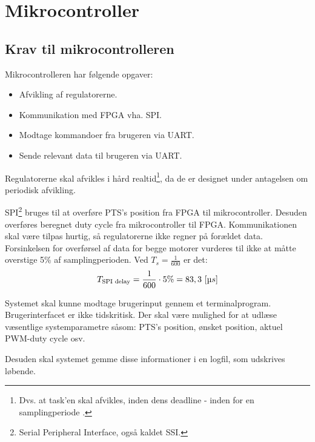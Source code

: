 \section{Mikrocontroller}
\label{sec:mikrocontroller}
%
\subsection{Krav til mikrocontrolleren}
Mikrocontrolleren har følgende opgaver: 

\begin{itemize}
\itemsep1pt
	\item Afvikling af regulatorerne.
	\item Kommunikation med FPGA vha. SPI.
	\item Modtage kommandoer fra brugeren via UART.
	\item Sende relevant data til brugeren via UART.
\end{itemize}

Regulatorerne skal afvikles i hård realtid\footnote{Dvs. at task'en skal afvikles, inden dens deadline - inden for en samplingperiode \citep{operating_systems_concepts_ed8}.},
da de er designet under antagelsen om periodisk afvikling.

SPI\footnote{Serial Peripheral Interface, også kaldet SSI.} bruges til at overføre PTS's position fra FPGA til mikrocontroller.
Desuden overføres beregnet duty cycle fra mikrocontroller til FPGA.
Kommunikationen skal være tilpas hurtig, så regulatorerne ikke regner på forældet data.
Forsinkelsen for overførsel af data for begge motorer vurderes til ikke at måtte overstige 5\% af samplingperioden.
Ved $T_s = \frac{1}{600}$ er det: 
\begin{equation}
	T_{\text{SPI delay}} = \frac{1}{600} \cdot 5\% = 83,3~[\micro s]
	\label{eq:uc:spi-krav}
\end{equation}

Systemet skal kunne modtage brugerinput gennem et terminalprogram.
Brugerinterfacet er ikke tidskritisk.
Der skal være mulighed for at udlæse væsentlige systemparametre såsom:
PTS's position, ønsket position, aktuel PWM-duty cycle osv.

Desuden skal systemet gemme disse informationer i en logfil,
som udskrives løbende.

